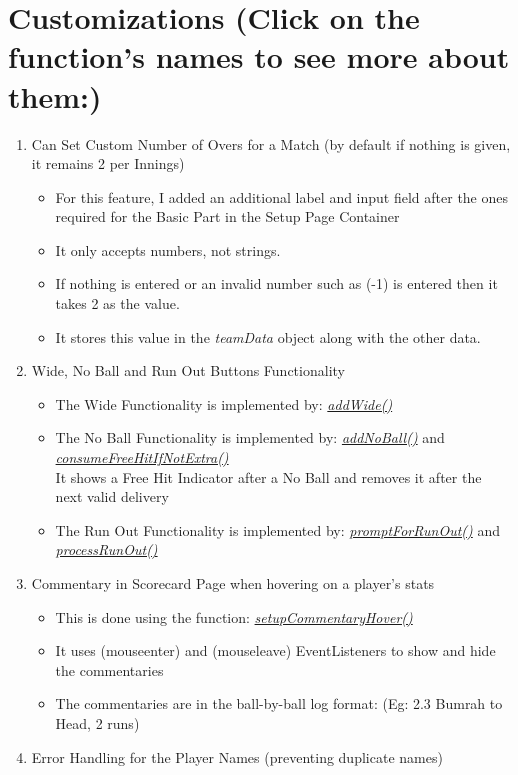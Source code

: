 \documentclass[a4paper,12pt]{article}
\begin{document}
\section{Customizations (Click on the function's names to see more about them:)}
\begin{enumerate}
\item Can Set Custom Number of Overs for a Match (by default if nothing is given, it remains 2 per Innings)
  \begin{itemize}
  \item For this feature, I added an additional label and input field after the ones required for the Basic Part in the Setup Page Container
  \item It only accepts numbers, not strings.
  \item If nothing is entered or an invalid number such as (-1) is entered then it takes 2 as the value.
  \item It stores this value in the \textit{teamData} object along with the other data.
  \end{itemize}
\item Wide, No Ball and Run Out Buttons Functionality 
  \begin{itemize}
  \item The Wide Functionality is implemented by: \hyperref[wide]{\textit{addWide()}} 
  \item The No Ball Functionality is implemented by: \hyperref[noBall1]{\textit{addNoBall()}} and \hyperref[noBall2]{\textit{consumeFreeHitIfNotExtra()}} \\ It shows a Free Hit Indicator after a No Ball and removes it after the next valid delivery
  \item The Run Out Functionality is implemented by: \hyperref[runOut1]{\textit{promptForRunOut()}} and \hyperref[runOut2]{\textit{processRunOut()}}
  \end{itemize}
\item Commentary in Scorecard Page when hovering on a player's stats
  \begin{itemize}
  \item This is done using the function: \hyperref[commentaryHover]{\textit{setupCommentaryHover()}}
  \item It uses (mouseenter) and (mouseleave) EventListeners to show and hide the commentaries
  \item The commentaries are in the ball-by-ball log format: (Eg: 2.3 Bumrah to Head, 2 runs) 
  \end{itemize}
\item Error Handling for the Player Names (preventing duplicate names)

\end{enumerate}
\end{document}
